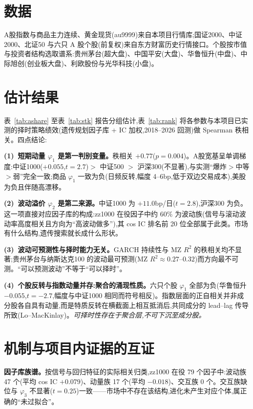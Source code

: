 \documentclass[11pt,a4paper,fontset=mac]{ctexart}
\begin{document}
\section{数据}
A股指数与商品主力连续、黄金现货(au9999)来自本项目行情库;国证2000、中证2000、北证50 与六只 A 股个股(前复权)来自东方财富历史行情接口。个股按市值与投资者结构选取谱系:贵州茅台(超大盘)、中国平安(大盘)、华鲁恒升(中盘)、中际旭创(创业板大盘)、利欧股份与光华科技(小盘)。

\section{估计结果}


表~\ref{tab:ashare} 至表~\ref{tab:stk} 报告分组估计,表~\ref{tab:rank} 将各参数与本项目已实测的择时策略绩效(遗传规划因子库 + IC 加权,2018--2026 回测)做 Spearman 秩相关。四点结论:

\textbf{(1)~短期动量 $\varphi_1$ 是第一判别变量。}秩相关 $+0.77$($p=0.004$)。A股宽基呈单调梯度:中证1000($+0.055$,$t=2.7$)$>$ 中证500 $>$ 沪深300(不显著),与实测``爆炸$>$中等$>$弱''完全一致;商品 $\varphi_1$ 一致为负(日频反转,幅度 4--6bp,低于双边交易成本),美股为负且伴随高漂移。

\textbf{(2)~波动溢价 $\varphi_2$ 是第二来源。}中证1000 为 $+11.0$bp/日($t=2.8$),沪深300 为负。这一项直接对应因子库的构成:zz1000 在役因子中约 $60\%$ 为波动族(信号与滚动波动率高度相关且方向为``高波动做多''),其 cos IC 排名前 20 位全部属于此类。市场有什么结构,遗传搜索就长成什么形状。

\textbf{(3)~波动可预测性与择时能力无关。}GARCH 持续性与 MZ $R^2$ 的秩相关均不显著;贵州茅台与纳斯达克100 的波动最可预测(MZ $R^2\approx0.27$--$0.32$)而方向最不可测。``可以预测波动''不等于``可以择时''。

\textbf{(4)~个股反转与指数动量并存:聚合的涌现性质。}六只个股 $\varphi_1$ 全部为负(华鲁恒升 $-0.055$,$t=-2.7$,幅度与中证1000 相同而符号相反)。指数层面的正自相关并非成分股各自具有动量,而是特质反转在横截面上相互抵消后,共同成分的 lead--lag 传导所致(Lo--MacKinlay)。\emph{可择时性存在于聚合层,不可下沉至成分股。}

\section{机制与项目内证据的互证}
\textbf{因子库族谱。}按信号与回归特征的实际相关归类,zz1000 在役 79 个因子中:波动族 47 个(平均 cos IC $+0.079$)、动量族 17 个(平均 $-0.018$)、交互族 0 个。交互族缺位与 $\varphi_3$ 不显著($t=0.25$)一致——市场中不存在该结构,进化未产生对应个体,属正确的``未过拟合''。
\end{document}
